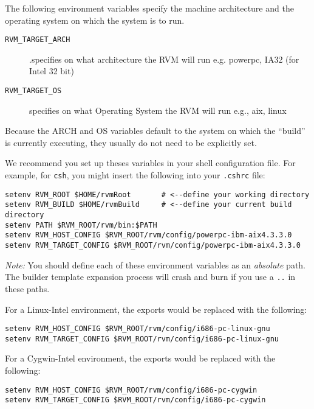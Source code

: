 \begin{enumerate}
The following environment variables specify the machine architecture and
the operating system on which the system is to run.
\begin{description}

\item [{\tt RVM\_TARGET\_ARCH}].specifies on what architecture
the RVM will run e.g.  powerpc, IA32 (for Intel 32 bit)

\item [{\tt RVM\_TARGET\_OS}] specifies on what Operating System
the RVM will run e.g., aix, linux

\end{description}

Because the ARCH and OS  variables default to the system on which 
the ``build'' is currently executing, they usually do not need to be 
explicitly set.


We recommend you set up theses variables in your shell configuration
file.  For example, for {\tt csh}, you might insert the
following into your {\tt .cshrc} file:

\begin{verbatim}
setenv RVM_ROOT $HOME/rvmRoot       # <--define your working directory 
setenv RVM_BUILD $HOME/rvmBuild     # <--define your current build directory 
setenv PATH $RVM_ROOT/rvm/bin:$PATH
setenv RVM_HOST_CONFIG $RVM_ROOT/rvm/config/powerpc-ibm-aix4.3.3.0
setenv RVM_TARGET_CONFIG $RVM_ROOT/rvm/config/powerpc-ibm-aix4.3.3.0
\end{verbatim}

{\em Note:} You should define each of these environment variables as an
{\em absolute} path.  The builder template expansion process will crash
and burn if you use a {\tt ..} in these paths.

For a Linux-Intel environment, the exports
would be replaced with the following:

\begin{verbatim}
setenv RVM_HOST_CONFIG $RVM_ROOT/rvm/config/i686-pc-linux-gnu
setenv RVM_TARGET_CONFIG $RVM_ROOT/rvm/config/i686-pc-linux-gnu
\end{verbatim}

For a Cygwin-Intel environment, the  exports
would be replaced with the following:

\begin{verbatim}
setenv RVM_HOST_CONFIG $RVM_ROOT/rvm/config/i686-pc-cygwin
setenv RVM_TARGET_CONFIG $RVM_ROOT/rvm/config/i686-pc-cygwin
\end{verbatim}


\end{enumerate}
